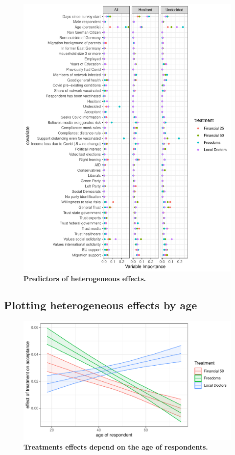 \documentclass[12pt]{article}
\begin{document}
\begin{figure}[h!]
	\centering
	\includegraphics[width=1\linewidth]{figures/figure_3.pdf}
	\caption{\textbf{Predictors of heterogeneous effects.}}
\end{figure}



\clearpage

\subsection{Plotting heterogeneous effects by age}

\begin{figure}[h!]
	\centering
	\includegraphics[width=1\linewidth]{figures/figure_12.pdf}
	\caption{\textbf{Treatments effects depend on the age of respondents.}}
\end{figure}



\clearpage
\end{document}
